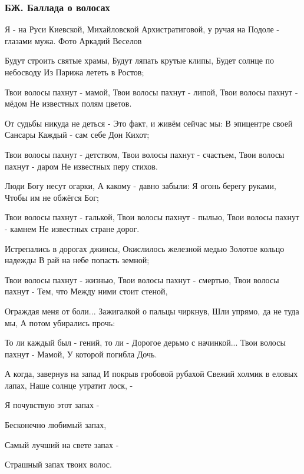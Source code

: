  
 
 

\subsubsection{БЖ. Баллада о волосах}
\label{sec:poetry.rus.evgenija_bilchenko.ballada_o_volosah}

Я - на Руси Киевской, Михайловской Архистратиговой, у ручая на Подоле - глазами мужа. Фото Аркадий Веселов

Будут строить святые храмы,
Будут ляпать крутые клипы,
Будет солнце по небосводу
Из Парижа лететь в Ростов;

Твои волосы пахнут - мамой,
Твои волосы пахнут - липой,
Твои волосы пахнут - мёдом
Не известных полям цветов.

От судьбы никуда не деться -
Это факт, и живём сейчас мы:
В эпицентре своей Сансары
Каждый - сам себе Дон Кихот;

Твои волосы пахнут - детством,
Твои волосы пахнут - счастьем,
Твои волосы пахнут - даром
Не известных перу стихов.

Люди Богу несут огарки,
А какому - давно забыли:
Я огонь берегу руками,
Чтобы им не обжёгся Бог;

Твои волосы пахнут - галькой,
Твои волосы пахнут - пылью,
Твои волосы пахнут - камнем
Не известных стране дорог.

Истрепались в дорогах джинсы,
Окислилось железной медью
Золотое кольцо надежды
В рай на небе попасть земной;

Твои волосы пахнут - жизнью,
Твои волосы пахнут - смертью,
Твои волосы пахнут - Тем, что
Между ними стоит стеной,

Ограждая меня от боли...
Зажигалкой о пальцы чиркнув,
Шли упрямо, да не туда мы,
А потом убирались прочь:

То ли каждый был - гений, то ли -
Дорогое дерьмо с начинкой...
Твои волосы пахнут - Мамой,
У которой погибла Дочь.

А когда, завернув на запад
И покрыв гробовой рубахой
Свежий холмик в еловых лапах,
Наше солнце утратит лоск, -

Я почувствую этот запах -

Бесконечно любимый запах,

Самый лучший на свете запах -

Страшный запах твоих волос.
